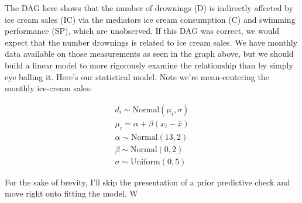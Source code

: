 \documentclass[
]{book}
\begin{document}
The DAG here shows that the number of drownings (D) is indirectly affected by ice cream sales (IC) via the mediators ice cream consumption (C) and swimming performance (SP), which are unobserved. If this DAG was correct, we would expect that the number drownings is related to ice cream sales. We have monthly data available on those measurements as seen in the graph above, but we should build a linear model to more rigorously examine the relationship than by simply eye balling it. Here's our statistical model. Note we're mean-centering the monthly ice-cream sales:

\[
\begin{array}{l}
d_i \sim \mathrm{Normal}(\mu_i, \sigma) \\
\mu_i = \alpha + \beta (x_i-\bar{x} ) \\ 
\alpha \sim \mathrm{Normal}(13, 2) \\
\beta \sim \mathrm{Normal}(0, 2) \\
\sigma \sim \mathrm{Uniform}(0, 5)
\end{array}
\]

For the sake of brevity, I'll skip the presentation of a prior predictive check and move right onto fitting the model. W
\end{document}
